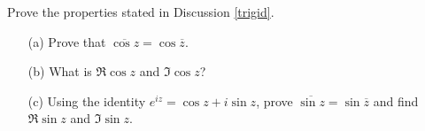 \vspace{0.1in}

\begin{problem}\label{prob 10.8}
Prove the properties stated in Discussion \ref{trigid}.
\end{problem}

\vspace{0.1in}

\begin{problem}\label{prob 10.9}\hfill
\begin{itemize}
\item[(a)] Prove that $\overline{\cos z} = \cos\overline{z}$.
\item[(b)] What is $\Re \cos z$ and $\Im \cos z$?
\item[(c)] Using the identity $e^{iz} = \cos z + i\sin z$, prove $\overline{\sin z} = \sin\overline{z}$ and find $\Re \sin z$ and $\Im \sin z$. 
\end{itemize}
\end{problem}